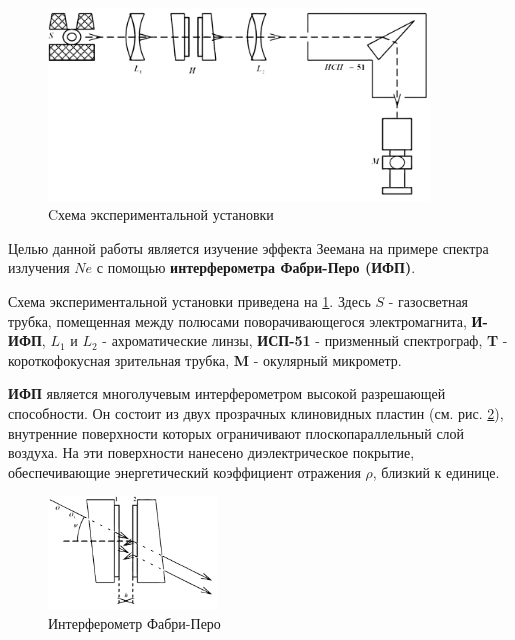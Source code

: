 \begin{figure}[H]{}
\centering
\vspace{-10pt}
\includegraphics[width=0.9\textwidth]{fig/fig6.jpg}
\vspace{-40pt}

\caption{Cхема экспериментальной установки} \label{fig:6}
\end{figure}

Целью данной работы является изучение эффекта Зеемана на примере спектра излучения $Ne$ с помощью \textbf{интерферометра Фабри-Перо (ИФП)}.

Схема экспериментальной установки приведена на \ref{fig:6}. Здесь $S$ - газосветная трубка, помещенная между полюсами поворачивающегося электромагнита, \textbf{И-ИФП}, $L_1$ и $L_2$ - ахроматические линзы, \textbf{ИСП-51} - призменный спектрограф, \textbf{T} - короткофокусная зрительная трубка, \textbf{M} - окулярный микрометр. 

\textbf{ИФП} является многолучевым интерферометром высокой разрешающей способности. Он состоит из двух прозрачных клиновидных пластин (см. рис. \ref{fig:7}), внутренние поверхности которых ограничивают плоскопараллельный слой воздуха. На эти поверхности нанесено диэлектрическое покрытие, обеспечивающие энергетический коэффициент отражения $\rho$, близкий к единице. 

\begin{figure}

\begin{center}
\vspace{-25pt}
\includegraphics[width=0.4\textwidth]{fig/fig7.jpg}
\caption{Интерферометр Фабри-Перо} \label{fig:7}

\end{center}

\end{figure}

